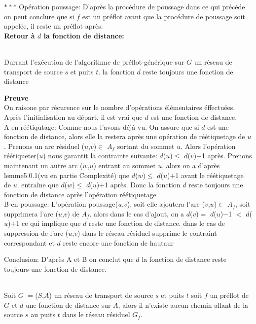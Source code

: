 $***$ Opération poussage:
D'après la procédure de poussage dans ce qui précéde on peut conclure que
si $f$ est un préflot avant que la procédure de poussage soit appelée, il reste un préflot après.\\

\textbf{Retour à $d$ la fonction de distance:}\\
\begin{lemma} ~\\
	\label{residual_path}Durrant l'exécution de l'algorithme de préflot-générique sur $G$ un réseau de transport de source $s$ et puits $t$. la fonction $d$ reste toujours une fonction de distance
\end{lemma}  
\textbf{Preuve} \\
  On raisone par récurence sur le nombre d'opérations élémentaires éffectuées.
  Après l'initialisation au départ, il est vrai que $d$ est une fonction de distance.\\
  
  A-en réétiqutage:
  Comme nous l'avons déjà vu.
  On assure que si $d$ est une fonction de distance, alors elle la restera après une opération de réétiquetage de $u$.
  Prenons un arc résiduel ($u$,$v$)$\in$ $A_f$  sortant du sommet $u$.
  Alors l'opération réétiqueter($u$) nous garantit la contrainte suivante:
  $d$($u$)$\leq$ $d$($v$)$+$1 après.
  Prenons maintenant un autre arc ($w$,$u$) entrant au sommet $u$. alors on a d'après lemme5.0.1(vu en partie Complexité) que $d$($w$)$\leq$ $d$($u$)$+$1 avant le réétiquetage de $u$. entraîne que $d$($w$)$\leq$ $d$($u$)$+$1 après. Donc la fonction $d$ reste toujours une fonction de distance après l'opération réétiquetage\\
  
  B-en poussage:
  L'opération poussage($u$,$v$), soit elle ajoutera l'arc ($v$,$u$)$\in$ $A_f$, soit supprimera l'arc ($u$,$v$) de $A_f$. alors dans le cas d'ajout, on a $d$($v$)$=$ $d$($u$)$-$1 $<$ $d$($u$)$+$1 ce qui implique que $d$ reste une fonction de distance. dans le cas de suppression de l'arc ($u$,$v$) dans le réseau résiduel supprime le contraint correspondant et $d$ reste encore une fonction de hautaur 
 
 Conclusion:
  D'après A et B on conclut que $d$ la fonction de distance reste toujours une fonction de distance.
  \\
   
\begin{lemma} ~\\
	\label{borne_reetiq}Soit $G$ $=$($S$,$A$) un réseau de transport de source $s$ et puits $t$ soit $f$ un préflot de $G$ et $d$ une fonction de distance sur $A$, alors il n'existe aucun chemin allant de la source $s$ au puits $t$ dans le réseau résiduel $G_f$.
\end{lemma} 

